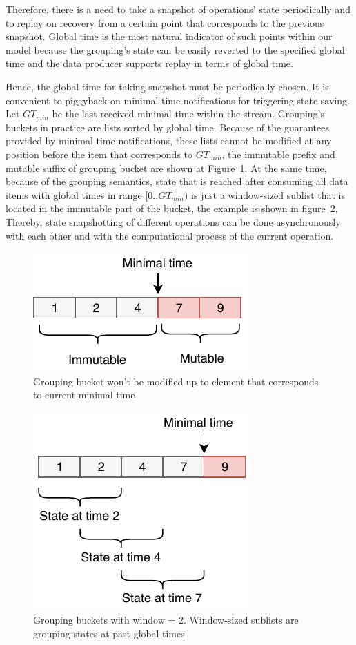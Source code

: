 Therefore, there is a need to take a snapshot of operations' state periodically and to replay on recovery from a certain point that corresponds to the previous snapshot. Global time is the most natural indicator of such points within our model because the grouping's state can be easily reverted to the specified global time and the data producer supports replay in terms of global time.   

Hence, the global time for taking snapshot must be periodically chosen. It is convenient to piggyback on minimal time notifications for triggering state saving. Let $GT_{min}$ be the last received minimal time within the stream. Grouping's buckets in practice are lists sorted by global time. Because of the guarantees provided by minimal time notifications, these lists cannot be modified at any position before the item that corresponds to $GT_{min}$, the immutable prefix and mutable suffix of grouping bucket are shown at Figure~\ref{immutable}. At the same time, because of the grouping semantics, state that is reached after consuming all data items with global times in range $[0..GT_{min})$ is just a window-sized sublist that is located in the immutable part of the bucket, the example is shown in figure~\ref{substate}. Thereby, state snapshotting of different operations can be done asynchronously with each other and with the computational process of the current operation. 

\begin{figure}[htbp]
  \centering
  \includegraphics[width=.3\textwidth]{pics/immutable}
  \caption{Grouping bucket won't be modified up to element that corresponds to current minimal time}
  \label {immutable}
\end{figure}

\begin{figure}[htbp]
  \centering
  \includegraphics[width=.3\textwidth]{pics/substate}
  \caption{Grouping buckets with window = 2. Window-sized sublists are grouping states at past global times}
  \label {substate}
\end{figure}

